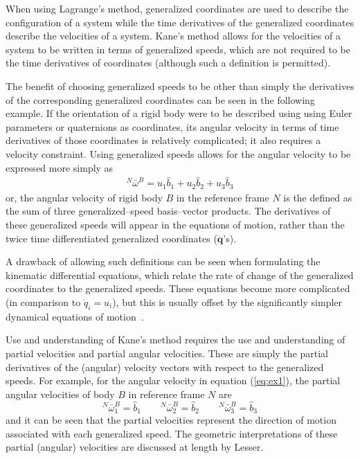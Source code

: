 \documentclass[smallcondensed,final]{svjour3}                     %
\begin{document}
When using Lagrange's method, generalized coordinates are used to describe the
configuration of a system while the time derivatives of the generalized
coordinates describe the velocities of a system.  Kane's method allows for the
velocities of a system to be written in terms of generalized speeds, which are
not required to be the time derivatives of coordinates (although such a
definition is permitted).

The benefit of choosing generalized speeds to be other than simply the
derivatives of the corresponding generalized coordinates can be seen in the
following example. If the orientation of a rigid body were to be described
using using Euler parameters or quaternions as coordinates, its angular
velocity in terms of time derivatives of those coordinates is relatively
complicated; it also requires a velocity constraint. Using generalized speeds
allows for the angular velocity to be expressed more simply as
\begin{align}
\label{eq:ex1}
{^N}\bar{\omega}^B = u_1 \hat{b}_1 + u_2 \hat{b}_2 + u_3 \hat{b}_3
\end{align}
or, the angular velocity of rigid body $B$ in the reference frame $N$ is the
defined as the sum of three generalized--speed basis--vector products.
The derivatives of these generalized speeds will appear in the equations
of motion, rather than the twice time differentiated generalized coordinates
($\ddot{\mathbf{q}}$'s).

A drawback of allowing such definitions can be seen when formulating the
kinematic differential equations, which relate the rate of change of the
generalized coordinates to the generalized speeds. These equations become more
complicated (in comparison to $\dot{q}_i = u_i$), but this is usually offset by
the significantly simpler dynamical equations of motion~\cite{Mitiguy1996}.

Use and understanding of Kane's method requires the use and understanding of
partial velocities and partial angular velocities. These are simply the
partial derivatives of the (angular) velocity vectors with respect to the
generalized speeds. For example, for the angular velocity in equation
(\ref{eq:ex1}), the partial angular velocities of body $B$ in reference frame
$N$ are
\[
{^N}\bar{\omega}^B_{1} = \hat{b}_1 \quad \quad
{^N}\bar{\omega}^B_{2} = \hat{b}_2 \quad \quad
{^N}\bar{\omega}^B_{3} = \hat{b}_3
\]
and it can be seen that the partial velocities represent the direction of
motion associated with each generalized speed. The geometric interpretations of
these partial (angular) velocities are discussed at length by
Lesser\cite{Lesser1992}.
\end{document}
